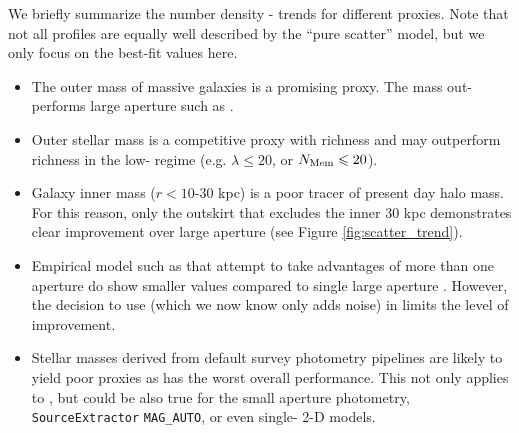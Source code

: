 \documentclass[fleqn,usenatbib,useAMS]{mnras}
\begin{document}
\begin{CJK*}{UTF8}{gbsn}
    We briefly summarize the number density - \sigmvir{} trends for different \mvir{} proxies.
    Note that not all \dsigma{} profiles are equally well described by the ``pure scatter'' model,
    but we only focus on the best-fit \sigmvir{} values here.

    \begin{itemize}
    
        \item The outer mass of massive galaxies is a promising \mvir{} proxy. 
            The  mass out-performs large aperture \mstar{} such as .
        
        \item Outer stellar mass is a competitive proxy with richness and may outperform richness in
            the low-\mvir{} regime (e.g. $\lambda \leq 20$, or $N_{\rm Mem} \leq 20$).
        
        \item Galaxy inner mass ($r< 10$-30 kpc) is a poor tracer of present day halo mass.
            For this reason, only the outskirt \mstar{} that excludes the inner 30 kpc demonstrates 
            clear improvement over large aperture \mstar{} (see Figure \ref{fig:scatter_trend}).
        
        \item Empirical model such as \asap{} that attempt to take advantages of more than one 
            aperture \mstar{} do show smaller \sigmvir{} values compared to single large aperture
            \mstar{}.
            However, the decision to use  (which we now know only adds noise) in
            \citet{Huang2020} limits the level of improvement.

        \item Stellar masses derived from default survey photometry pipelines are likely to yield
            poor \mvir{} proxies as \mcmodel{} has the worst overall performance.
            This not only applies to \cmodel{}, but could be also true for the small aperture
            photometry, \texttt{SourceExtractor} \texttt{MAG\_AUTO}, or even single-\ser{} 2-D
            models.
            
    \end{itemize}


\end{CJK*}
\end{document}
